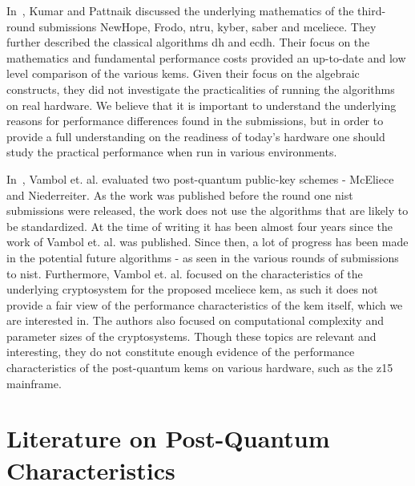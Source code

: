 In~\cite{kumar2020}, Kumar and Pattnaik discussed the underlying mathematics of the third-round submissions NewHope, Frodo, \gls{ntru}, \gls{kyber}, \gls{saber} and \gls{mceliece}. They further described the classical algorithms \gls{dh} and \gls{ecdh}. Their focus on the mathematics and fundamental performance costs provided an up-to-date and low level comparison of the various \glspl{kem}. Given their focus on the algebraic constructs, they did not investigate the practicalities of running the algorithms on real hardware. We believe that it is important to understand the underlying reasons for performance differences found in the submissions, but in order to provide a full understanding on the readiness of today's hardware one should study the practical performance when run in various environments.

In~\cite{vambol2017}, Vambol et. al. evaluated two \gls{post-quantum} public-key schemes - McEliece and Niederreiter. As the work was published before the round one \gls{nist} submissions were released, the work does not use the algorithms that are likely to be standardized. At the time of writing it has been almost four years since the work of Vambol et. al. was published. Since then, a lot of progress has been made in the potential future algorithms - as seen in the various rounds of submissions to \gls{nist}. Furthermore, Vambol et. al. focused on the characteristics of the underlying cryptosystem for the proposed \gls{mceliece} \gls{kem}, as such it does not provide a fair view of the performance characteristics of the \gls{kem} itself, which we are interested in. The authors also focused on computational complexity and parameter sizes of the cryptosystems. Though these topics are relevant and interesting, they do not constitute enough evidence of the performance characteristics of the \gls{post-quantum} \glspl{kem} on various hardware, such as the \gls{z15} mainframe.

\section{Literature on Post-Quantum Characteristics}
\label{section:related-work:post-quantum-characteristics}



